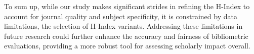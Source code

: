To sum up, while our study makes significant strides in refining the H-Index to
account for journal quality and subject specificity, it is constrained by data
limitations, the selection of H-Index variants. Addressing these limitations in
future research could further enhance the accuracy and fairness of bibliometric
evaluations, providing a more robust tool for assessing scholarly impact
overall.